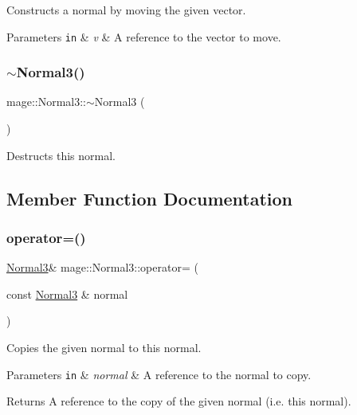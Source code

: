 Constructs a normal by moving the given vector.


\begin{DoxyParams}[1]{Parameters}
\mbox{\tt in}  & {\em v} & A reference to the vector to move. \\
\hline
\end{DoxyParams}
\hypertarget{structmage_1_1_normal3_a3384b2970fd85fe729514ce0686b4446}{}\label{structmage_1_1_normal3_a3384b2970fd85fe729514ce0686b4446} 
\subsubsection{\texorpdfstring{$\sim$\+Normal3()}{~Normal3()}}
{\footnotesize\ttfamily mage\+::\+Normal3\+::$\sim$\+Normal3 (\begin{DoxyParamCaption}{ }\end{DoxyParamCaption})\hspace{0.3cm}{\ttfamily [default]}}

Destructs this normal. 

\subsection{Member Function Documentation}
\hypertarget{structmage_1_1_normal3_ad446f029ba58615f98b4da13e7e4c5ba}{}\label{structmage_1_1_normal3_ad446f029ba58615f98b4da13e7e4c5ba} 
\subsubsection{\texorpdfstring{operator=()}{operator=()}\hspace{0.1cm}{\footnotesize\ttfamily [1/2]}}
{\footnotesize\ttfamily \hyperlink{structmage_1_1_normal3}{Normal3}\& mage\+::\+Normal3\+::operator= (\begin{DoxyParamCaption}\item[{const \hyperlink{structmage_1_1_normal3}{Normal3} \&}]{normal }\end{DoxyParamCaption})\hspace{0.3cm}{\ttfamily [default]}}

Copies the given normal to this normal.


\begin{DoxyParams}[1]{Parameters}
\mbox{\tt in}  & {\em normal} & A reference to the normal to copy. \\
\hline
\end{DoxyParams}
\begin{DoxyReturn}{Returns}
A reference to the copy of the given normal (i.\+e. this normal). 
\end{DoxyReturn}
\hypertarget{structmage_1_1_normal3_ab8fd629ae1e399b468a229fc4ea58222}{}\label{structmage_1_1_normal3_ab8fd629ae1e399b468a229fc4ea58222} 
